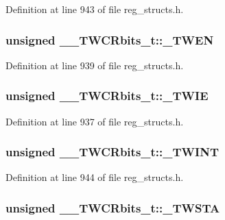 Definition at line 943 of file reg\+\_\+structs.\+h.

\hypertarget{union_____t_w_c_rbits__t_a2ccc1448460231c19857d0ecd1849fb0}{
\subsubsection[{\+\_\+\+T\+W\+E\+N}]{\setlength{\rightskip}{0pt plus 5cm}unsigned \+\_\+\+\_\+\+T\+W\+C\+Rbits\+\_\+t\+::\+\_\+\+T\+W\+E\+N}}\label{union_____t_w_c_rbits__t_a2ccc1448460231c19857d0ecd1849fb0}


Definition at line 939 of file reg\+\_\+structs.\+h.

\hypertarget{union_____t_w_c_rbits__t_a4d2bedf1efc4fa333f2dd5a82fe1e9ef}{
\subsubsection[{\+\_\+\+T\+W\+I\+E}]{\setlength{\rightskip}{0pt plus 5cm}unsigned \+\_\+\+\_\+\+T\+W\+C\+Rbits\+\_\+t\+::\+\_\+\+T\+W\+I\+E}}\label{union_____t_w_c_rbits__t_a4d2bedf1efc4fa333f2dd5a82fe1e9ef}


Definition at line 937 of file reg\+\_\+structs.\+h.

\hypertarget{union_____t_w_c_rbits__t_a5f4e9f5b9c0ed6962626c471b8aead9e}{
\subsubsection[{\+\_\+\+T\+W\+I\+N\+T}]{\setlength{\rightskip}{0pt plus 5cm}unsigned \+\_\+\+\_\+\+T\+W\+C\+Rbits\+\_\+t\+::\+\_\+\+T\+W\+I\+N\+T}}\label{union_____t_w_c_rbits__t_a5f4e9f5b9c0ed6962626c471b8aead9e}


Definition at line 944 of file reg\+\_\+structs.\+h.

\hypertarget{union_____t_w_c_rbits__t_abfe9c57703e8ba38ce9515bfdcfd9b38}{
\subsubsection[{\+\_\+\+T\+W\+S\+T\+A}]{\setlength{\rightskip}{0pt plus 5cm}unsigned \+\_\+\+\_\+\+T\+W\+C\+Rbits\+\_\+t\+::\+\_\+\+T\+W\+S\+T\+A}}\label{union_____t_w_c_rbits__t_abfe9c57703e8ba38ce9515bfdcfd9b38}


